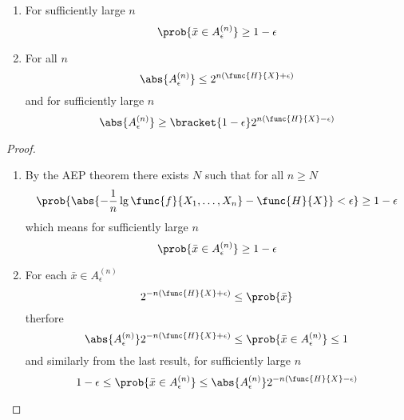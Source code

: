\begin{proposition}
    \begin{enumerate}
        \item For sufficiently large \(n\)
        \begin{equation*}
            \prob{\bar{x} \in A^{(n)}_{\epsilon}} \geq 1 -\epsilon
        \end{equation*}
        \item For all \(n\) 
        \begin{equation*}
            \abs{A_{\epsilon}^{(n)}} \leq 2^{n (\func{H}{X} + \epsilon)}
        \end{equation*}
        and for sufficiently large \(n\)
        \begin{equation*}
            \abs{A_{\epsilon}^{(n)}} \geq \bracket{1 - \epsilon} 2^{n (\func{H}{X} - \epsilon)}
        \end{equation*}
    \end{enumerate}
\end{proposition}

\begin{proof}
    \begin{enumerate}
        \item By the AEP theorem there exists \(N\) such that for all \(n \geq N\)
        \begin{equation*}
            \prob{\abs{-\dfrac{1}{n} \lg \func{f}{X_1 , \dots , X_n} - \func{H}{X}} < \epsilon} \geq 1 - \epsilon
        \end{equation*}
        which means for sufficiently large \(n\) 
        \begin{equation*}
            \prob{\bar{x} \in A^{(n)}_{\epsilon}} \geq 1 -\epsilon
        \end{equation*}
        \item For each \(\bar{x} \in A_{\epsilon}^{(n)}\) 
        \begin{equation*}
            2^{-n (\func{H}{X} + \epsilon)} \leq \prob{\bar{x}}
        \end{equation*}
        therfore 
        \begin{equation*}
            \abs{A_{\epsilon}^{(n)}} 2^{-n (\func{H}{X} + \epsilon)} \leq \prob{\bar{x} \in A^{(n)}_{\epsilon}} \leq 1
        \end{equation*}
        and similarly from the last result, for sufficiently large \(n\)
        \begin{equation*}
            1 - \epsilon \leq \prob{\bar{x} \in A^{(n)}_{\epsilon}} \leq \abs{A_{\epsilon}^{(n)}} 2^{-n (\func{H}{X} - \epsilon)}
        \end{equation*}
    \end{enumerate}
\end{proof}

